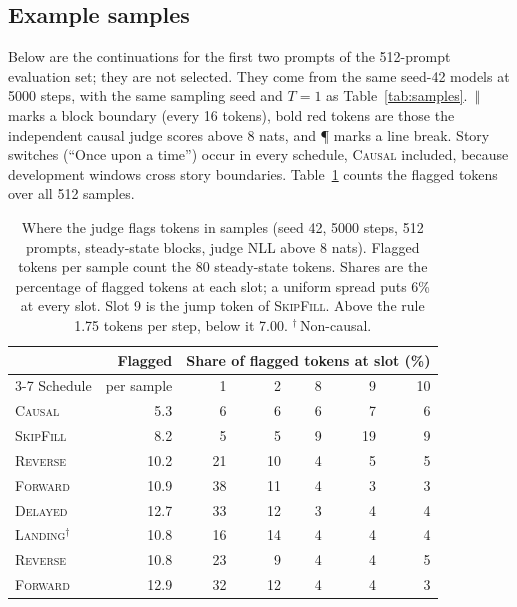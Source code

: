 \documentclass{article}
\theoremstyle{definition}
\theoremstyle{remark}
\newcommand{\name}[1]{\textup{\textsc{#1}}}
\newcommand{\sfill}{\name{SkipFill}\xspace}
\newcommand{\rev}{\name{Reverse}\xspace}
\newcommand{\fwd}{\name{Forward}\xspace}
\newcommand{\causal}{\name{Causal}\xspace}
\newcommand{\delayed}{\name{Delayed}\xspace}
\newcommand{\landing}{\name{Landing}\xspace}
\newcommand{\blk}{\,{\color{black!45}$\Vert$}\,}
\begin{document}
\subsection{Example samples}
\label{app:examples}

Below are the continuations for the first two prompts of the 512-prompt evaluation set; they are not selected.
They come from the same seed-42 models at 5000 steps, with the same sampling seed and $T=1$ as Table~\ref{tab:samples}.
\blk{} marks a block boundary (every 16 tokens), bold red tokens are those the independent causal judge scores above 8 nats, and \P{} marks a line break.
Story switches (``Once upon a time'') occur in every schedule, \causal included, because development windows cross story boundaries.
Table~\ref{tab:breaks} counts the flagged tokens over all 512 samples.

\begin{table}[h]
  \centering
  \caption{Where the judge flags tokens in samples (seed 42, 5000 steps, 512 prompts, steady-state blocks, judge NLL above 8 nats). Flagged tokens per sample count the 80 steady-state tokens. Shares are the percentage of flagged tokens at each slot; a uniform spread puts 6\% at every slot. Slot 9 is the jump token of \sfill. Above the rule 1.75 tokens per step, below it 7.00. $^\dagger$\,Non-causal.}
  \label{tab:breaks}
  \small
  \begin{tabular}{lrrrrrr}
    \toprule
    & Flagged & \multicolumn{5}{c}{Share of flagged tokens at slot (\%)} \\
    \cmidrule(lr){3-7}
    Schedule & per sample & 1 & 2 & 8 & 9 & 10 \\
    \midrule
    \causal             & 5.3  & 6  & 6  & 6 & 7  & 6 \\
    \sfill              & 8.2  & 5  & 5  & 9 & 19 & 9 \\
    \rev                & 10.2 & 21 & 10 & 4 & 5  & 5 \\
    \fwd                & 10.9 & 38 & 11 & 4 & 3  & 3 \\
    \delayed            & 12.7 & 33 & 12 & 3 & 4  & 4 \\
    \midrule
    \landing$^\dagger$  & 10.8 & 16 & 14 & 4 & 4  & 4 \\
    \rev                & 10.8 & 23 & 9  & 4 & 4  & 5 \\
    \fwd                & 12.9 & 32 & 12 & 4 & 4  & 3 \\
    \bottomrule
  \end{tabular}
\end{table}
\end{document}
